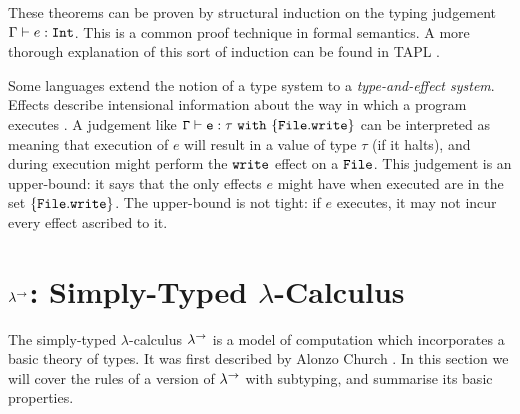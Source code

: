 These theorems can be proven by structural induction on the typing judgement $\Gamma \vdash e: \mathtt{Int}$. This is a common proof technique in formal semantics. A more thorough explanation of this sort of induction can be found in TAPL \cite[p. 31]{tapl}.

Some languages extend the notion of a type system to a \textit{type-and-effect system}. Effects describe intensional information about the way in which a program executes \cite{nielson99}. A judgement like $\mathtt{\Gamma \vdash e: \tau~\mathtt{with}~ \{ File.write \}}$ can be interpreted as meaning that execution of $e$ will result in a value of type $\tau$ (if it halts), and during execution might perform the $\mathtt{write}$ effect on a $\mathtt{File}$. This judgement is an upper-bound: it says that the only effects $e$ might have when executed are in the set $\{ \mathtt{File.write} \}$. The upper-bound is not tight: if $e$ executes, it may not incur every effect ascribed to it.

\section{ $\lambda^{\rightarrow}$: Simply-Typed $\lambda$-Calculus}

The simply-typed $\lambda$-calculus $\lambda^{\rightarrow}$ is a model of computation which incorporates a basic theory of types. It was first described by Alonzo Church \cite{church40}. In this section we will cover the rules of a version of $\lambda^{\rightarrow}$ with subtyping, and summarise its basic properties.


